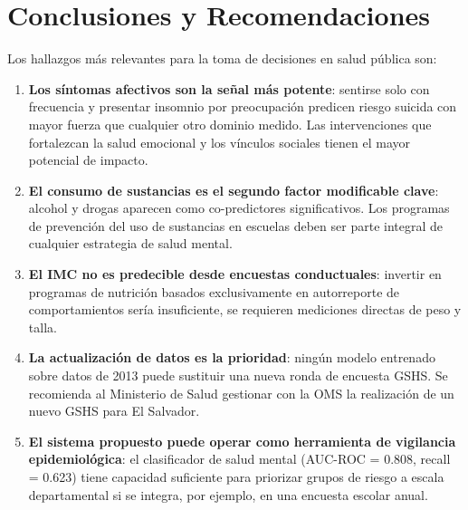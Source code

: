 \documentclass[conference]{IEEEtran}
\begin{document}
\section{Conclusiones y Recomendaciones}

Los hallazgos más relevantes para la toma de decisiones en salud pública son:

\begin{enumerate}
  \item \textbf{Los síntomas afectivos son la señal más potente}: sentirse solo con frecuencia y presentar insomnio por preocupación predicen riesgo suicida con mayor fuerza que cualquier otro dominio medido. Las intervenciones que fortalezcan la salud emocional y los vínculos sociales tienen el mayor potencial de impacto.
  \item \textbf{El consumo de sustancias es el segundo factor modificable clave}: alcohol y drogas aparecen como co-predictores significativos. Los programas de prevención del uso de sustancias en escuelas deben ser parte integral de cualquier estrategia de salud mental.
  \item \textbf{El IMC no es predecible desde encuestas conductuales}: invertir en programas de nutrición basados exclusivamente en autorreporte de comportamientos sería insuficiente, se requieren mediciones directas de peso y talla.
  \item \textbf{La actualización de datos es la prioridad}: ningún modelo entrenado sobre datos de 2013 puede sustituir una nueva ronda de encuesta GSHS. Se recomienda al Ministerio de Salud gestionar con la OMS la realización de un nuevo GSHS para El Salvador.
  \item \textbf{El sistema propuesto puede operar como herramienta de vigilancia epidemiológica}: el clasificador de salud mental (AUC-ROC = 0.808, recall = 0.623) tiene capacidad suficiente para priorizar grupos de riesgo a escala departamental si se integra, por ejemplo, en una encuesta escolar anual.
\end{enumerate}
\end{document}
